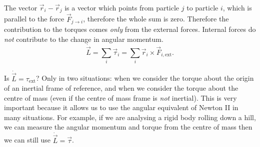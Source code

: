 \documentclass[../classical_mechanics.tex]{subfiles}
\begin{document}
        The vector $\vec{r}_i-\vec{r}_j$ is a vector which points from particle $j$ to particle $i$, which is parallel to the force $\vec{F}_{j\to i}$, therefore the whole sum is zero.
        Therefore the contribution to the torques comes \textit{only} from the external forces.
        Internal forces do \textit{not} contribute to the change in angular momentum.
        \begin{equation}
            \dot{\vec{L}}=\sum_i\vec{\tau}_i=\sum_i\vec{r}_i\times\vec{F}_{i,\text{ext}}.
        \end{equation}

        Is $\dot{\vec{L}}=\tau_\text{ext}$?
        Only in two situations: when we consider the torque about the origin of an inertial frame of reference, and when we consider the torque about the centre of mass (even if the centre of mass frame is \textit{not} inertial).
        This is very important because it allows us to use the angular equivalent of Newton II in many situations.
        For example, if we are analysing a rigid body rolling down a hill, we can measure the angular momentum and torque from the centre of mass then we can still use $\dot{\vec{L}}=\vec{\tau}$.
\end{document}
